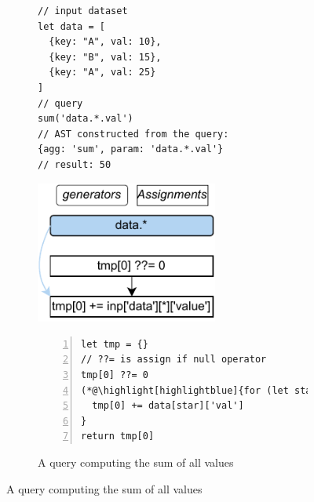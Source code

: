 \documentclass[runningheads]{llncs}
\begin{document}
\begin{figure}[t!]
\begin{subfigure}{\textwidth}
\begin{minipage}{0.3\textwidth}
\begin{lstlisting}[style=JavaScriptTiny, columns=flexible]
// input dataset
let data = [
  {key: "A", val: 10},
  {key: "B", val: 15},
  {key: "A", val: 25}
]
// query
sum('data.*.val')
// AST constructed from the query:
{agg: 'sum', param: 'data.*.val'}
// result: 50
\end{lstlisting}
\end{minipage}
\begin{minipage}{0.3\textwidth}
\hspace{3.6mm}
\includegraphics[width=0.657\textwidth]{images/intro_q1_ir.pdf}
\end{minipage}
\begin{minipage}{0.38\textwidth}
\begin{lstlisting}[style=JavaScriptTiny, columns=flexible, numbers=left, xleftmargin=2pt]
let tmp = {}
// ??= is assign if null operator
tmp[0] ??= 0
(*@\highlight[highlightblue]{for (let star in data) }@*) {
  tmp[0] += data[star]['val']
}
return tmp[0]
\end{lstlisting}
\end{minipage}
\vspace{-4mm}
\caption{A query computing the sum of all values}\label{fig:intro_q1}
\end{subfigure}


\end{figure}
\end{document}
